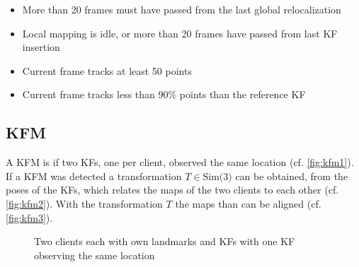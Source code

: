 \begin{itemize}
  \item More than 20 frames must have passed from the last global relocalization
  \item Local mapping is idle, or more than 20 frames have passed from last \ac{KF} insertion
  \item Current frame tracks at least 50 points
  \item Current frame tracks less than 90\% points than the reference \ac{KF}
\end{itemize}

\subsection{\acf{KFM}}
A \acf{KFM} is if two \acp{KF}, one per client, observed the same location (cf. \autoref{fig:kfm1}). If a \ac{KFM} was detected a transformation $T \in \text{Sim(3)}$ can be obtained, from the poses of the \acp{KF}, which relates the maps of the two clients to each other (cf. \autoref{fig:kfm2}). With the transformation $T$ the maps than can be aligned (cf. \autoref{fig:kfm3}).

\begin{figure}[H]
  \centering
  \caption{Two clients each with own landmarks and \acp{KF} with one \ac{KF} observing the same location}
  \label{fig:kfm1}
\end{figure}

